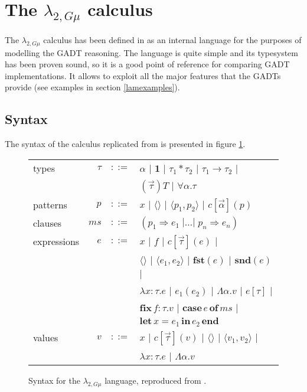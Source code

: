 \section{The $\lambda_{2,G\mu}$ calculus}

The $\lambda_{2,G\mu}$ calculus has been defined in \cite{XiGRDT} as an internal language for the purposes of modelling the GADT reasoning. The language is quite simple and its typesystem has been proven sound, so it is a good point of reference for comparing GADT implementations. It allows to exploit all the major features that the GADTs provide (see examples in section \ref{lamexamples}).

\subsection{Syntax}

The syntax of the calculus replicated from \cite{XiGRDT} is presented in figure \ref{lamsyntax}.

\begin{figure}
  \begin{tabular}{lrcl}
    types & $\tau$ & $::=$ & $\alpha$ | $\mathbf{1}$ | $\tau_1 * \tau_2$ | $\tau_1 \to \tau_2$ | \\
    & & & $(\overrightarrow{\tau}) T$ | $\forall \alpha. \tau$ \\
    patterns & $p$ & $::=$ & $x$ | $\langle \rangle$ | $\langle p_1, p_2 \rangle$ | $c[\overrightarrow{\alpha}](p)$ \\
    clauses & $ms$ & $::=$ & $(p_1 \Rightarrow e_1 \; | \dots | \; p_n \Rightarrow e_n)$ \\
    expressions & $e$ & $::=$ & $x$ | $f$ | $c[\overrightarrow{\tau}](e)$ | \\
    & & &  $\langle \rangle$ | $\langle e_1, e_2 \rangle$ | $\mathbf{fst}(e)$ | $\mathbf{snd}(e)$ | \\
    & & & $\lambda x : \tau. e$ | $e_1 (e_2)$ | $\Lambda \alpha. v$ | $e[\tau]$ | \\
    & & & $\mathbf{fix} \, f : \tau. v$ | $\mathbf{case} \, e \, \mathbf{of} \, ms$ | \\
    & & & $\mathbf{let} \, x = e_1 \, \mathbf{in} \, e_2 \, \mathbf{end}$ \\
    values & $v$ & $::=$ & $x$ | $c[\overrightarrow{\tau}](v)$ | $\langle \rangle$ | $\langle v_1, v_2 \rangle$ | \\
    & & & $\lambda x : \tau. e$ | $\Lambda \alpha. v$
  \end{tabular}
  \caption{Syntax for the $\lambda_{2,G\mu}$ language, reproduced from \cite{XiGRDT}.}
  \label{lamsyntax}
\end{figure}

